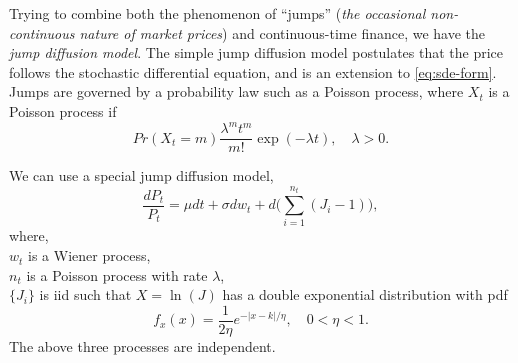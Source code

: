 Trying to combine both the phenomenon of ``jumps'' (\textit{the occasional non-continuous nature of market prices}) and continuous-time finance, we have the \emph{jump diffusion model}.
The simple jump diffusion model postulates that the price follows the stochastic differential equation, and is an extension to \eqref{eq:sde-form}. Jumps are governed by a probability law such as a Poisson process, where $X_t$ is a Poisson process if
\[
Pr(X_t=m) \frac{\lambda^m t^m}{m!}\exp(-\lambda t), \quad \lambda>0.
\]

We can use a special jump diffusion model,
\[
\frac{dP_t}{P_t}=\mu dt + \sigma dw_t + d \Bigg( \sum^{n_t}_{i=1}(J_i-1) \Bigg),
\]
where, \\
$w_t$ is a Wiener process, \\
$n_t$ is a Poisson process with rate $\lambda$, \\
$\{J_i\}$ is iid such that $X=\ln(J)$ has a double exponential distribution with pdf
\[
f_x(x) = \frac{1}{2\eta} e^{-|x-k|/\eta}, \quad 0<\eta<1.
\]
The above three processes are independent.